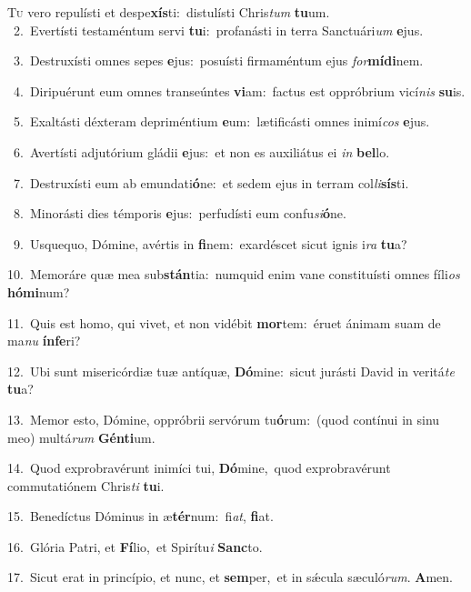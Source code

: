 \lettrine{\initial\textcolor{\initialcolor}{T}}{u} vero repulísti et despe\-\textbf{xís}\-ti:~\star distulísti Chris\textit{tum} \textbf{tu}\-um.\\
{\numbfont\textcolor{\numbcolor}{~2.}}~Evertísti testaméntum servi \textbf{tu}\-i:~\star profanásti in terra Sanctuári\textit{um} \textbf{e}\-jus.\par
{\numbfont\textcolor{\numbcolor}{~3.}}~Destruxísti omnes sepes \textbf{e}\-jus:~\star posuísti firmaméntum ejus \textit{for}\-\textbf{mí}\textbf{di}nem.\par
{\numbfont\textcolor{\numbcolor}{~4.}}~Diripuérunt eum omnes transeúntes \textbf{vi}\-am:~\star factus est oppróbrium vicí\textit{nis} \textbf{su}\-is.\par
{\numbfont\textcolor{\numbcolor}{~5.}}~Exaltásti déxteram depriméntium \textbf{e}\-um:~\star lætificásti omnes inimí\textit{cos} \textbf{e}\-jus.\par
{\numbfont\textcolor{\numbcolor}{~6.}}~Avertísti adjutórium gládii \textbf{e}\-jus:~\star et non es auxiliátus ei \textit{in} \textbf{bel}\-lo.\par
{\numbfont\textcolor{\numbcolor}{~7.}}~Destruxísti eum ab emundati\-\textbf{ó}\-ne:~\star et sedem ejus in terram col\-\textit{li}\-\textbf{sís}ti.\par
{\numbfont\textcolor{\numbcolor}{~8.}}~Minorásti dies témporis \textbf{e}\-jus:~\star perfudísti eum confu\-\textit{si}\-\textbf{ó}ne.\par
{\numbfont\textcolor{\numbcolor}{~9.}}~Usquequo, Dómine, avértis in \textbf{fi}\-nem:~\star exardéscet sicut ignis i\textit{ra} \textbf{tu}\-a?\par
{\numbfont\textcolor{\numbcolor}{10.}}~Memoráre quæ mea sub\-\textbf{stán}\-tia:~\star numquid enim vane constituísti omnes fíli\textit{os} \textbf{hó}\-\textbf{mi}num?\par
{\numbfont\textcolor{\numbcolor}{11.}}~Quis est homo, qui vivet, et non vidébit \textbf{mor}\-tem:~\star éruet ánimam suam de ma\textit{nu} \textbf{ín}\-\textbf{fe}ri?\par
{\numbfont\textcolor{\numbcolor}{12.}}~Ubi sunt misericórdiæ tuæ antíquæ, \textbf{Dó}\-mine:~\star sicut jurásti David in veritá\textit{te} \textbf{tu}\-a?\par
{\numbfont\textcolor{\numbcolor}{13.}}~Memor esto, Dómine, oppróbrii servórum tu\-\textbf{ó}\-rum:~\star (quod contínui in sinu meo) multá\textit{rum} \textbf{Gén}\-\textbf{ti}um.\par
{\numbfont\textcolor{\numbcolor}{14.}}~Quod exprobravérunt inimíci tui, \textbf{Dó}\-mine,~\star quod exprobravérunt commutatiónem Chris\textit{ti} \textbf{tu}\-i.\par
{\numbfont\textcolor{\numbcolor}{15.}}~Benedíctus Dóminus in æ\-\textbf{tér}\-num:~\star fi\-\textit{at}\-, \textbf{fi}\-at.\par
{\numbfont\textcolor{\numbcolor}{16.}}~Glória Patri, et \textbf{Fí}\-lio,~\star et Spirítu\textit{i} \textbf{Sanc}\-to.\par
{\numbfont\textcolor{\numbcolor}{17.}}~Sicut erat in princípio, et nunc, et \textbf{sem}\-per,~\star et in sǽcula sæculó\-\textit{rum}\-. \textbf{A}\-men.\par
